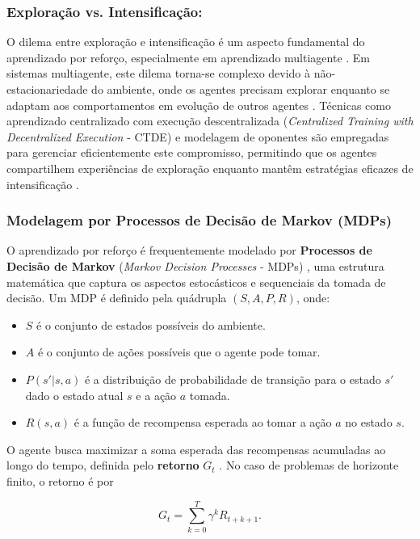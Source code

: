 \subsubsection*{Exploração vs. Intensificação:}
O dilema entre exploração e intensificação é um aspecto fundamental do aprendizado por reforço, especialmente em aprendizado multiagente \cite{PPO}. Em sistemas multiagente, este dilema torna-se complexo devido à não-estacionariedade do ambiente, onde os agentes precisam explorar enquanto se adaptam aos comportamentos em evolução de outros agentes \cite{bruno_brandao}. Técnicas como aprendizado centralizado com execução descentralizada (\textit{Centralized Training with Decentralized Execution} - CTDE) e modelagem de oponentes são empregadas para gerenciar eficientemente este compromisso, permitindo que os agentes compartilhem experiências de exploração enquanto mantêm estratégias eficazes de intensificação \cite{ppo_exploration_exploitation}.

\subsubsection*{Modelagem por Processos de Decisão de Markov (MDPs)}

O aprendizado por reforço é frequentemente modelado por \textbf{Processos de Decisão de Markov} (\textit{Markov Decision Processes} - MDPs) \cite{sutton}, uma estrutura matemática que captura os aspectos estocásticos e sequenciais da tomada de decisão. Um MDP é definido pela quádrupla \((S, A, P, R)\), onde:

\begin{itemize}
    \item \(S\) é o conjunto de estados possíveis do ambiente.
    \item \(A\) é o conjunto de ações possíveis que o agente pode tomar.
    \item \(P(s'|s, a)\) é a distribuição de probabilidade de transição para o estado \(s'\) dado o estado atual \(s\) e a ação \(a\) tomada.
    \item \(R(s, a)\) é a função de recompensa esperada ao tomar a ação \(a\) no estado \(s\).
\end{itemize}

O agente busca maximizar a soma esperada das recompensas acumuladas ao longo do tempo, definida pelo \textbf{retorno} \(G_t\) \cite{sutton}. No caso de problemas de horizonte finito, o retorno é por 

\begin{equation}
\label{eq:retorno_finito}
G_t = \sum_{k=0}^{T} \gamma^k R_{t+k+1}.
\end{equation}

